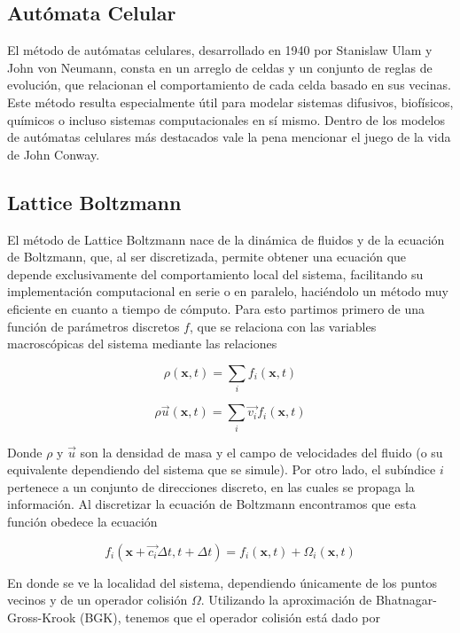 \documentclass[12pts, letterpaper]{article}
\begin{document}
\subsection{Autómata Celular}
El método de autómatas celulares, desarrollado en 1940 por Stanislaw Ulam y John von 
Neumann, consta en un arreglo de celdas y un conjunto de reglas de evolución, que 
relacionan el comportamiento de cada celda basado en sus vecinas. Este método resulta 
especialmente útil para modelar sistemas difusivos, biofísicos, químicos o incluso 
sistemas computacionales en sí mismo. Dentro de los modelos de autómatas celulares más 
destacados vale la pena mencionar el juego de la vida de John Conway.

\subsection{Lattice Boltzmann}
El método de Lattice Boltzmann nace de la dinámica de fluidos y de la ecuación de 
Boltzmann, que, al ser discretizada, permite obtener una ecuación que depende 
exclusivamente del comportamiento local del sistema, facilitando su implementación 
computacional en serie o en paralelo, haciéndolo un método muy eficiente en cuanto a 
tiempo de cómputo. Para esto partimos primero de una función de parámetros discretos $f$, 
que se relaciona con las variables macroscópicas del sistema mediante las relaciones 

\begin{equation*}
    \rho(\textbf{x}, t) = \sum_i f_i(\textbf{x}, t)
\end{equation*}

\begin{equation*}
    \rho\vec{u}(\textbf{x}, t) = \sum_i \vec{v_i} f_i(\textbf{x}, t)
\end{equation*}

Donde $\rho$ y $\vec{u}$ son la densidad de masa y el campo de velocidades del fluido (o 
su equivalente dependiendo del sistema que se simule). Por otro lado, el subíndice $i$ 
pertenece a un conjunto de direcciones discreto, en las cuales se propaga la información.
Al discretizar la ecuación de Boltzmann encontramos que esta función obedece la ecuación

\begin{equation}\label{eq:LB}
    f_i(\textbf{x}+\vec{c_i} \Delta t, t+\Delta t) = f_i(\textbf{x}, t) + \Omega_i(\textbf{x}, t)
\end{equation}

En donde se ve la localidad del sistema, dependiendo únicamente de los puntos vecinos y de 
un operador colisión $\Omega$. Utilizando la aproximación de Bhatnagar-Gross-Krook (BGK), 
tenemos que el operador colisión está dado por 
\end{document}
